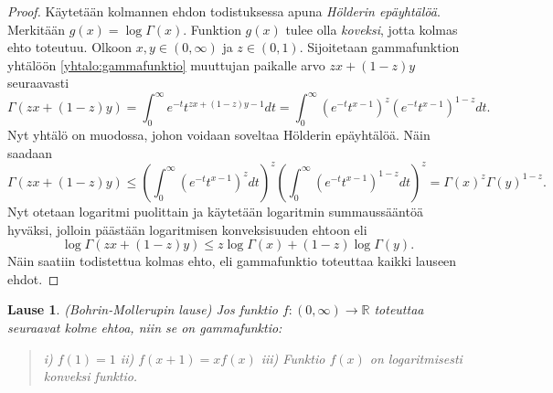 \documentclass[12pt]{article}
\theoremstyle{definition}
\theoremstyle{plain}
\newtheorem{lause}{Lause}
\numberwithin{equation}{section}
\begin{document}
\begin{proof}
Käytetään kolmannen ehdon todistuksessa apuna \emph{Hölderin epäyhtälöä}. Merkitään $g(x) = \log\Gamma(x)$. Funktion $g(x)$ tulee olla \emph{koveksi}, jotta kolmas ehto toteutuu.\newline
Olkoon $x,y\in(0,\infty)$ ja $z\in(0,1)$. Sijoitetaan gammafunktion yhtälöön \eqref{yhtalo:gammafunktio} muuttujan paikalle arvo $zx+(1-z)y$ seuraavasti
\begin{equation*}
    \Gamma(zx+(1-z)y)=\int_{0}^{\infty}e^{-t}t^{zx+(1-z)y-1}dt = \int_{0}^{\infty}(e^{-t}t^{x-1})^{z}(e^{-t}t^{x-1})^{1-z}dt.
\end{equation*}
Nyt yhtälö on muodossa, johon voidaan soveltaa Hölderin epäyhtälöä. Näin saadaan
\begin{equation*}
    \Gamma(zx+(1-z)y)\le \left( \int_{0}^{\infty}(e^{-t}t^{x-1})^{z}dt\right)^{z}\left(\int_{0}^{\infty}(e^{-t}t^{x-1})^{1-z}dt \right)^{z}=\Gamma(x)^{z}\Gamma(y)^{1-z}.
\end{equation*}
Nyt otetaan logaritmi puolittain ja käytetään logaritmin summaussääntöä hyväksi, jolloin päästään logaritmisen konveksisuuden ehtoon eli
\begin{equation*}
    \log\Gamma(zx+(1-z)y)\le z\log\Gamma(x)+(1-z)\log\Gamma(y).
\end{equation*}
Näin saatiin todistettua kolmas ehto, eli gammafunktio toteuttaa kaikki lauseen ehdot. \newline
\end{proof}
\newpage

\begin{lause}
(Bohrin-Mollerupin lause)
Jos funktio $f: (0, \infty) \rightarrow \mathbb{R}$ toteuttaa seuraavat kolme ehtoa, niin se on gammafunktio:
\begin{quote}
i) $f(1)=1$ \newline
ii) $f(x+1)=xf(x)$ \newline
iii) Funktio $f(x)$ on logaritmisesti konveksi funktio.
\end{quote}
\end{lause}
\end{document}
